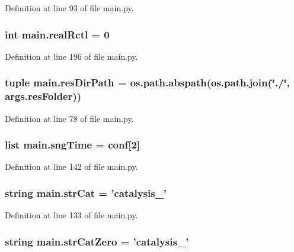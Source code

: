 Definition at line 93 of file main.\-py.

\hypertarget{a00151_a2dcb93d1b24fce96491e031528ed43c0}{
\subsubsection[{real\-Rctl}]{\setlength{\rightskip}{0pt plus 5cm}int main.\-real\-Rctl = 0}}\label{a00151_a2dcb93d1b24fce96491e031528ed43c0}


Definition at line 196 of file main.\-py.

\hypertarget{a00151_a93d7d68ada532b3cedaab103283ab91a}{
\subsubsection[{res\-Dir\-Path}]{\setlength{\rightskip}{0pt plus 5cm}tuple main.\-res\-Dir\-Path = os.\-path.\-abspath(os.\-path.\-join(\char`\"{}./\char`\"{}, args.\-res\-Folder))}}\label{a00151_a93d7d68ada532b3cedaab103283ab91a}


Definition at line 78 of file main.\-py.

\hypertarget{a00151_ab4296f1ae2e4c4bb597ca27e84849510}{
\subsubsection[{sng\-Time}]{\setlength{\rightskip}{0pt plus 5cm}list main.\-sng\-Time = {\bf conf}\mbox{[}2\mbox{]}}}\label{a00151_ab4296f1ae2e4c4bb597ca27e84849510}


Definition at line 142 of file main.\-py.

\hypertarget{a00151_ab12df661b7defb4d7077777ad7d6352d}{
\subsubsection[{str\-Cat}]{\setlength{\rightskip}{0pt plus 5cm}string main.\-str\-Cat = 'catalysis\-\_\-'}}\label{a00151_ab12df661b7defb4d7077777ad7d6352d}


Definition at line 133 of file main.\-py.

\hypertarget{a00151_a6bb1e2c0e0d0a9e63313c082ee4eec76}{
\subsubsection[{str\-Cat\-Zero}]{\setlength{\rightskip}{0pt plus 5cm}string main.\-str\-Cat\-Zero = 'catalysis\-\_\-'}}\label{a00151_a6bb1e2c0e0d0a9e63313c082ee4eec76}


